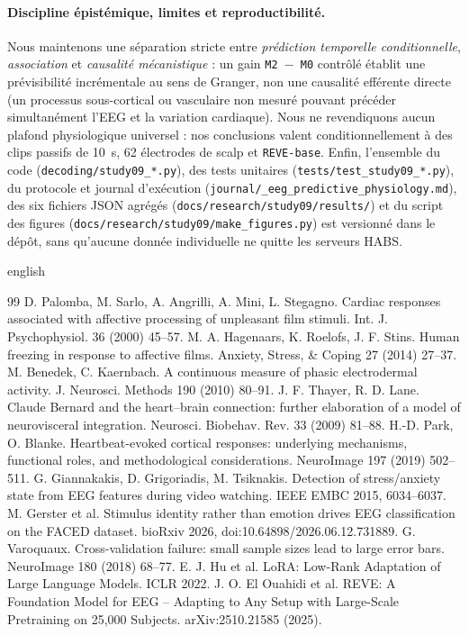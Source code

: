 \documentclass[10pt]{article}
\begin{document}
\paragraph{Discipline épistémique, limites et reproductibilité.}
Nous maintenons une séparation stricte entre \emph{prédiction temporelle conditionnelle}, \emph{association} et \emph{causalité mécanistique} : un gain \texttt{M2 $-$ M0} contrôlé établit une prévisibilité incrémentale au sens de Granger, non une causalité efférente directe (un processus sous-cortical ou vasculaire non mesuré pouvant précéder simultanément l'EEG et la variation cardiaque). Nous ne revendiquons aucun plafond physiologique universel : nos conclusions valent conditionnellement à des clips passifs de 10~s, 62 électrodes de scalp et \texttt{REVE-base}. Enfin, l'ensemble du code (\texttt{decoding/\allowbreak study09\_*.py}), des tests unitaires (\texttt{tests/\allowbreak test\_study09\_*.py}), du protocole et journal d'exécution (\texttt{journal/\_eeg\_predictive\_physiology.md}), des six fichiers JSON agrégés (\texttt{docs/\allowbreak research/\allowbreak study09/\allowbreak results/}) et du script des figures (\texttt{docs/\allowbreak research/\allowbreak study09/\allowbreak make\_figures.py}) est versionné dans le dépôt, sans qu'aucune donnée individuelle ne quitte les serveurs HABS.

\begin{otherlanguage*}{english}
\begin{thebibliography}{99}\footnotesize\setlength{\itemsep}{1.2pt}
 D. Palomba, M. Sarlo, A. Angrilli, A. Mini, L. Stegagno. Cardiac responses associated with affective processing of unpleasant film stimuli. Int. J. Psychophysiol. 36 (2000) 45--57.
 M. A. Hagenaars, K. Roelofs, J. F. Stins. Human freezing in response to affective films. Anxiety, Stress, \& Coping 27 (2014) 27--37.
 M. Benedek, C. Kaernbach. A continuous measure of phasic electrodermal activity. J. Neurosci. Methods 190 (2010) 80--91.
 J. F. Thayer, R. D. Lane. Claude Bernard and the heart--brain connection: further elaboration of a model of neurovisceral integration. Neurosci. Biobehav. Rev. 33 (2009) 81--88.
 H.-D. Park, O. Blanke. Heartbeat-evoked cortical responses: underlying mechanisms, functional roles, and methodological considerations. NeuroImage 197 (2019) 502--511.
 G. Giannakakis, D. Grigoriadis, M. Tsiknakis. Detection of stress/anxiety state from EEG features during video watching. IEEE EMBC 2015, 6034--6037.
 M. Gerster et al. Stimulus identity rather than emotion drives EEG classification on the FACED dataset. bioRxiv 2026, doi:10.64898/2026.06.12.731889.
 G. Varoquaux. Cross-validation failure: small sample sizes lead to large error bars. NeuroImage 180 (2018) 68--77.
 E. J. Hu et al. LoRA: Low-Rank Adaptation of Large Language Models. ICLR 2022.
 J. O. El Ouahidi et al. REVE: A Foundation Model for EEG -- Adapting to Any Setup with Large-Scale Pretraining on 25,000 Subjects. arXiv:2510.21585 (2025).
\end{thebibliography}
\end{otherlanguage*}
\end{document}
